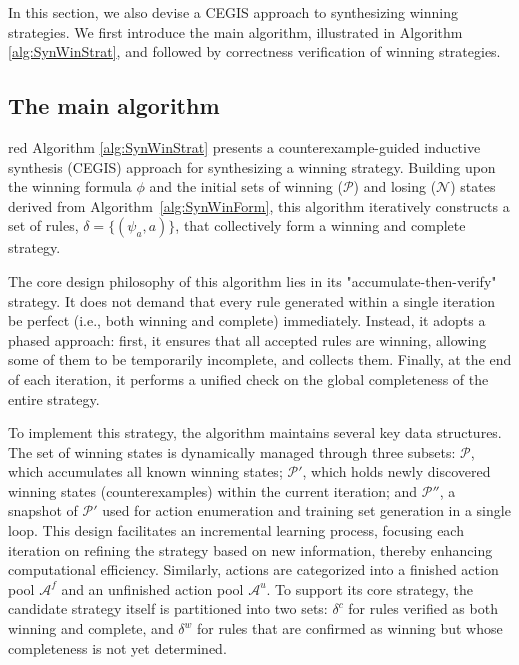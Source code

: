 \documentclass[review]{elsarticle}
\newcommand{\set}[1]{\{ #1 \}}
\newcommand{\positiveSet}{\mathcal{P}}
\newcommand{\negativeSet}{\mathcal{N}}
\newcommand{\act}{\mathcal{A}}
\begin{document}
In this section, we also devise a CEGIS approach to synthesizing winning strategies.
We first introduce the main algorithm, illustrated in Algorithm \ref{alg:SynWinStrat}, and followed by correctness verification of winning strategies.


\subsection{The main algorithm}
\begin{color}{red}
Algorithm \ref{alg:SynWinStrat} presents a counterexample-guided inductive synthesis (CEGIS) approach for synthesizing a winning strategy.
Building upon the winning formula $\phi$ and the initial sets of winning ($\positiveSet$) and losing ($\negativeSet$) states derived from Algorithm~\ref{alg:SynWinForm}, 
this algorithm iteratively constructs a set of rules, $\delta = \set{(\psi_a, a)}$, that collectively form a winning and complete strategy.

The core design philosophy of this algorithm lies in its "accumulate-then-verify" strategy. 
It does not demand that every rule generated within a single iteration be perfect (i.e., both winning and complete) immediately. 
Instead, it adopts a phased approach: first, it ensures that all accepted rules are winning, allowing some of them to be temporarily incomplete, and collects them. 
Finally, at the end of each iteration, it performs a unified check on the global completeness of the entire strategy.

To implement this strategy, the algorithm maintains several key data structures. 
The set of winning states is dynamically managed through three subsets: $\positiveSet$, which accumulates all known winning states; 
$\positiveSet'$, which holds newly discovered winning states (counterexamples) within the current iteration; 
and $\positiveSet''$, a snapshot of $\positiveSet'$ used for action enumeration and training set generation in a single loop. 
This design facilitates an incremental learning process, focusing each iteration on refining the strategy based on new information, thereby enhancing computational efficiency. 
Similarly, actions are categorized into a finished action pool $\act^f$ and an unfinished action pool $\act^u$. 
To support its core strategy, the candidate strategy itself is partitioned into two sets: 
$\delta^c$ for rules verified as both winning and complete, and $\delta^w$ for rules that are confirmed as winning but whose completeness is not yet determined.


\end{color}
\end{document}
